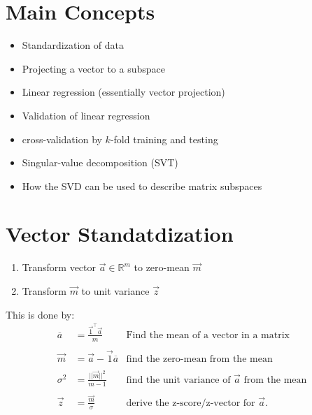 \documentclass[12pt]{book}
\title{\coursetitle\linebreak\lecturename}
\author{\\Cain Susko\\ 
           \\ \\ \\
      Queen's University 
    \\School of Computing\\}
\begin{document}
\begin{titlepage}
        \maketitle
\end{titlepage}


\section*{Main Concepts}
\begin{itemize}
        \item Standardization of data
        \item Projecting a vector to a subspace
        \item Linear regression (essentially vector projection)
        \item Validation of linear regression
        \item cross-validation by $k$-fold training and testing
        \item Singular-value decomposition (SVT)
        \item How the SVD can be used to describe matrix subspaces
\end{itemize}

\section*{Vector Standatdization}
\begin{enumerate}
        \item Transform vector $\vec a\in \mathbb{R}^m$ to zero-mean  $\vec m$ 
        \item Transform $\vec m$ to unit variance  $\vec z$
\end{enumerate}
This is done by:
\begin{align*}
        \overline{a} &= \frac{\vec 1^\top \vec a}{m} &\text{Find the mean of a vector in a matrix}\\
        \\
        \vec m &= \vec a - \vec 1 \overline{a} &\text{find the zero-mean from the mean} \\
        \\
        \sigma^2 &= \frac{||\vec m||^2}{m-1} &\text{find the unit variance of $\vec a$ from the mean}\\
        \\
        \vec z &= \frac{\vec m}{\sigma} &\text{derive the z-score/z-vector for $\vec a$}
.\end{align*}
\end{document}
